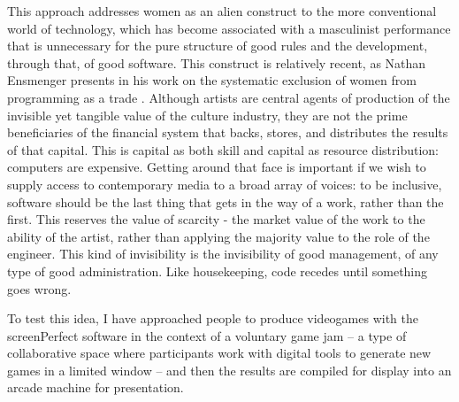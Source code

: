 This approach addresses women as an alien construct to the more conventional world of technology, which has become associated with a masculinist performance that is unnecessary for the pure structure of good rules and the development, through that, of good software. This construct is relatively recent, as Nathan Ensmenger presents in his work on the systematic exclusion of women from programming as a trade \parencite{ensmenger}.
Although artists are central agents of production of the invisible yet tangible value of the culture industry, they are not the prime beneficiaries of the financial system that backs, stores, and distributes the results of that capital. This is capital as both skill and capital as resource distribution: computers are expensive. Getting around that face is important if we wish to supply access to contemporary media to a broad array of voices: to be inclusive, software should be the last thing that gets in the way of a work, rather than the first. This reserves the value of scarcity - the market value of the work to the ability of the artist, rather than applying the majority value to the role of the engineer. This kind of invisibility is the invisibility of good management, of any type of good administration. Like housekeeping, code recedes until something goes wrong.

To test this idea, I have approached people to produce videogames with the screenPerfect software in the context of a voluntary game jam – a type of collaborative space where participants work with digital tools to generate new games in a limited window – and then the results are compiled for display into an arcade machine for presentation.

